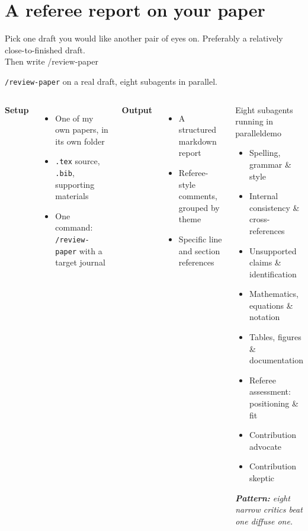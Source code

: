 \documentclass[aspectratio=169, 10pt]{beamer}
\begin{document}
\section{A referee report on your paper}
\sourceline{}

\begin{transitionframe}
Pick one draft you would like another pair of eyes on. Preferably a relatively close-to-finished draft. \\
\bigskip 
Then write /review-paper 
\end{transitionframe}



\begin{frame}{\texttt{/review-paper} on a real draft, eight subagents in parallel.}
\begin{columns}[t]
\textbf{Setup}
\begin{itemize}\footnotesize
  \item One of my own papers, in its own folder
  \item \texttt{.tex} source, \texttt{.bib}, supporting materials
  \item One command: \texttt{/review-paper} with a target journal
\end{itemize}

\vskip0.15cm
\textbf{Output}
\begin{itemize}\footnotesize
  \item A structured markdown report
  \item Referee-style comments, grouped by theme
  \item Specific line and section references
\end{itemize}

\begin{mckcardg}[mcknavy]{Eight subagents running in parallel}{demo}
\footnotesize
\begin{itemize}\setlength{\itemsep}{0pt}
  \item Spelling, grammar \& style
  \item Internal consistency \& cross-references
  \item Unsupported claims \& identification
  \item Mathematics, equations \& notation
  \item Tables, figures \& documentation
  \item Referee assessment: positioning \& fit
  \item Contribution advocate
  \item Contribution skeptic
\end{itemize}
\textcolor{mcknavy}{\itshape\scriptsize \textbf{Pattern:} eight narrow critics beat one diffuse one.}
\end{mckcardg}
\end{columns}

\end{frame}
\end{document}
